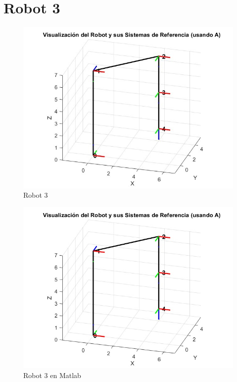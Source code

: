 \section{Robot 3}



\begin{figure}
	\centering
	\includegraphics[width=0.7\linewidth]{img/Robot3}
	\caption{Robot 3}
	\label{fig:robot3}
\end{figure}


\begin{figure}
	\centering
	\includegraphics[width=0.7\linewidth]{img/robot_3}
	\caption{Robot 3 en Matlab}
	\label{fig:robot_3}
\end{figure}
